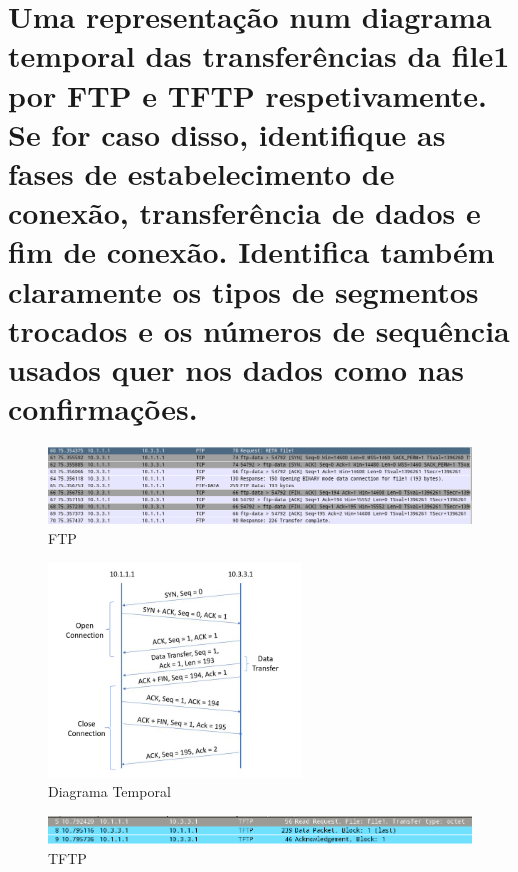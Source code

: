 \documentclass[a4paper]{report}
\begin{document}
\section{Uma representação num diagrama temporal das transferências da file1 por FTP e TFTP respetivamente. Se for caso disso,
identifique as fases de estabelecimento de conexão, transferência de dados e fim de conexão. Identifica também claramente
os tipos de segmentos trocados e os números de sequência usados quer nos dados como nas confirmações.}

\begin{figure}[H]
    \centering 
    \includegraphics[width=\textwidth]{images/2ftp.png}  
    \caption{FTP}
    \label{fig:2ftp}
\end{figure}

\begin{figure}[H]
    \centering 
    \includegraphics[width=0.6\textwidth]{images/diagrama.png}  
    \caption{Diagrama Temporal}
    \label{fig:diagrama}
\end{figure}

\begin{figure}[H]
    \centering 
    \includegraphics[width=\textwidth]{images/2tftp.png}  
    \caption{TFTP}
    \label{fig:2tft:}
\end{figure}
\end{document}
